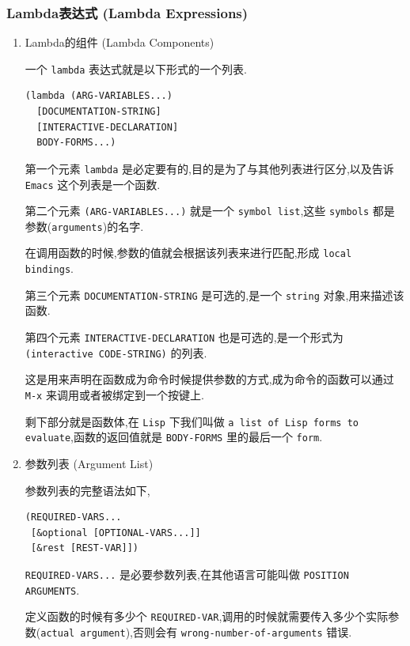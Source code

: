 \documentclass[11pt]{article}
\begin{document}
\subsubsection{Lambda表达式 (Lambda Expressions)}
\label{sec:org5ffd341}

\begin{enumerate}
\item Lambda的组件 (Lambda Components)
\label{sec:orgb61b28d}

一个 \texttt{lambda} 表达式就是以下形式的一个列表.

\begin{verbatim}
(lambda (ARG-VARIABLES...)
  [DOCUMENTATION-STRING]
  [INTERACTIVE-DECLARATION]
  BODY-FORMS...)
\end{verbatim}

第一个元素 \texttt{lambda} 是必定要有的,目的是为了与其他列表进行区分,以及告诉 \texttt{Emacs} 这个列表是一个函数.

第二个元素 \texttt{(ARG-VARIABLES...)} 就是一个 \texttt{symbol list},这些 \texttt{symbols} 都是参数(\texttt{arguments})的名字.

在调用函数的时候,参数的值就会根据该列表来进行匹配,形成 \texttt{local bindings}.

第三个元素 \texttt{DOCUMENTATION-STRING} 是可选的,是一个 \texttt{string} 对象,用来描述该函数.

第四个元素 \texttt{INTERACTIVE-DECLARATION} 也是可选的,是一个形式为 \texttt{(interactive CODE-STRING)} 的列表.

这是用来声明在函数成为命令时候提供参数的方式,成为命令的函数可以通过 \texttt{M-x} 来调用或者被绑定到一个按键上.

剩下部分就是函数体,在 \texttt{Lisp} 下我们叫做 \texttt{a list of Lisp forms to evaluate},函数的返回值就是 \texttt{BODY-FORMS} 里的最后一个 \texttt{form}.


\item 参数列表 (Argument List)
\label{sec:org7df97be}

参数列表的完整语法如下,

\begin{verbatim}
(REQUIRED-VARS...
 [&optional [OPTIONAL-VARS...]]
 [&rest [REST-VAR]])
\end{verbatim}

\texttt{REQUIRED-VARS...} 是必要参数列表,在其他语言可能叫做 \texttt{POSITION ARGUMENTS}.

定义函数的时候有多少个 \texttt{REQUIRED-VAR},调用的时候就需要传入多少个实际参数(\texttt{actual argument}),否则会有 \texttt{wrong-number-of-arguments} 错误.


\end{enumerate}
\end{document}
